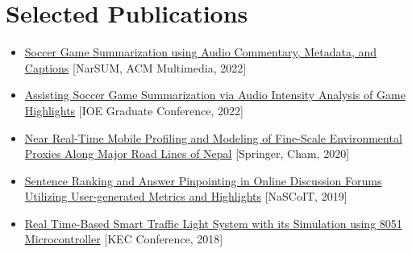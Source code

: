 \documentclass{resumex}
\begin{document}
\section{Selected Publications}
\begin{itemize}
   
 \item {\href{https://dl.acm.org/doi/10.1145/3552463.3557019}{Soccer Game Summarization using Audio Commentary, Metadata, and Captions}}
[NarSUM, ACM Multimedia, 2022]


 \item {\href{https://www.researchgate.net/publication/363737872_Assisting_Soccer_Game_Summarization_via_Audio_Intensity_Analysis_of_Game_Highlights}{Assisting Soccer Game Summarization via Audio Intensity Analysis of Game Highlights}}
[IOE Graduate Conference, 2022]

 \item {\href{https://www.researchgate.net/publication/347751604_Near_Real-Time_Mobile_Profiling_and_Modeling_of_Fine-Scale_Environmental_Proxies_Along_Major_Road_Lines_of_Nepal}{Near Real-Time Mobile Profiling and Modeling of Fine-Scale Environmental Proxies Along Major Road Lines of Nepal}}
[Springer, Cham, 2020]

 \item {\href{https://www.researchgate.net/publication/330041750_Sentence_Ranking_and_Answer_Pinpointing_in_Online_Discussion_Forums_Utilising_User-generated_Metrics_and_Highlights}{Sentence Ranking and Answer Pinpointing in Online Discussion Forums Utilizing User-generated Metrics and Highlights}}
[NaSCoIT, 2019]

 \item {\href{https://www.researchgate.net/publication/328043517_Real_Time-Based_Smart_Traffic_Light_System_with_its_Simulation_using_8051_Microcontroller}{Real Time-Based Smart Traffic Light System with its Simulation using 8051 Microcontroller}}
[KEC Conference, 2018]

\end{itemize}
\end{document}
